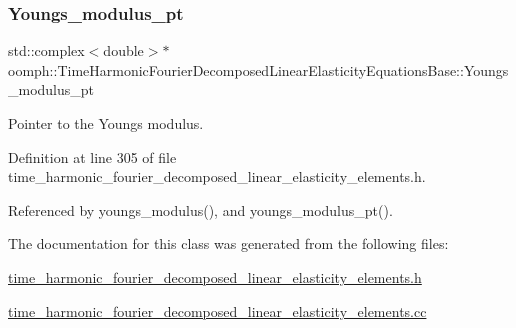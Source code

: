 \subsubsection{\texorpdfstring{Youngs\+\_\+modulus\+\_\+pt}{Youngs\_modulus\_pt}}
{\footnotesize\ttfamily std\+::complex$<$double$>$$\ast$ oomph\+::\+Time\+Harmonic\+Fourier\+Decomposed\+Linear\+Elasticity\+Equations\+Base\+::\+Youngs\+\_\+modulus\+\_\+pt\hspace{0.3cm}{\ttfamily [protected]}}



Pointer to the Young\textquotesingle{}s modulus. 



Definition at line 305 of file time\+\_\+harmonic\+\_\+fourier\+\_\+decomposed\+\_\+linear\+\_\+elasticity\+\_\+elements.\+h.



Referenced by youngs\+\_\+modulus(), and youngs\+\_\+modulus\+\_\+pt().



The documentation for this class was generated from the following files\+:\begin{DoxyCompactItemize}
\item 
\hyperlink{time__harmonic__fourier__decomposed__linear__elasticity__elements_8h}{time\+\_\+harmonic\+\_\+fourier\+\_\+decomposed\+\_\+linear\+\_\+elasticity\+\_\+elements.\+h}\item 
\hyperlink{time__harmonic__fourier__decomposed__linear__elasticity__elements_8cc}{time\+\_\+harmonic\+\_\+fourier\+\_\+decomposed\+\_\+linear\+\_\+elasticity\+\_\+elements.\+cc}\end{DoxyCompactItemize}
